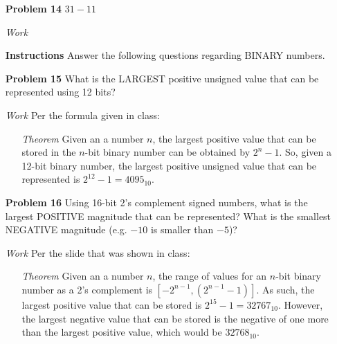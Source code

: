 \documentclass[12pt]{article}
\begin{document}
\begin{enumerate}
  \item[\textbf{Problem 14}] $31-11$
\end{enumerate}

\begin{enumerate}
  \item[\textit{Work}]
\end{enumerate}

\begin{enumerate}
  \item[\textbf{Instructions}] Answer the following questions regarding BINARY numbers.
\end{enumerate}

\begin{enumerate}
  \item[\textbf{Problem 15}] What is the LARGEST positive unsigned value that can be represented using 12 bits?
\end{enumerate}

\begin{enumerate}
  \item[\textit{Work}] Per the formula given in class:
  \begin{enumerate}
    \item[\textit{Theorem}] Given an a number $n$, the largest positive value that can be stored in the $n$-bit binary number can be obtained by $2^n-1$. So, given a 12-bit binary number, the largest positive unsigned value that can be represented is $2^{12}-1=4095_{10}$.
  \end{enumerate}
\end{enumerate}


\begin{enumerate}
  \item[\textbf{Problem 16}] Using 16-bit 2’s complement signed numbers, what is the largest POSITIVE magnitude that can be represented?  What is the smallest NEGATIVE magnitude (e.g. $-10$ is smaller than $-5$)?
\end{enumerate}

\begin{enumerate}
  \item[\textit{Work}] Per the slide that was shown in class:
  \begin{enumerate}
    \item[\textit{Theorem}] Given an a number $n$, the range of values for an $n$-bit binary number as a 2's complement is $[-2^{n-1},(2^{n-1}-1)]$. As such, the largest positive value that can be stored is $2^{15}-1=32767_{10
    }$. However, the largest negative value that can be stored is the negative of one more than the largest positive value, which would be $32768_{10}$.
  \end{enumerate}
\end{enumerate}
\end{document}
